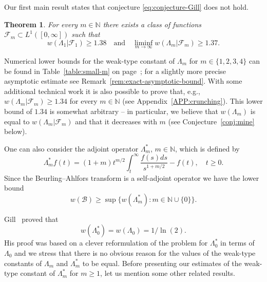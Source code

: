 \documentclass[a4paper]{amsart} %
\newtheorem{theorem}{Theorem}[section]
\theoremstyle{definition}
\theoremstyle{remark}
\numberwithin{equation}{section}
\newcommand*{\LongArxivOrShortJournalVersion}[2]{#1}
\newcommand*{\NN}{\mathbb{N}}
\newcommand*{\NNzero}{\mathbb{N}\cup\{0\}}
\newcommand*{\NNone}{\mathbb{N}}
\newcommand*{\BA}{\mathcal{B}}
\newcommand*{\weakconst}[1]{w(#1)} %
\newcommand*{\weakconstrestricted}[2]{w(#1|#2)} %
\newcommand*{\fclassspec}[1]{\mathcal{F}_{#1}}
\begin{document}
Our first main result states that conjecture \eqref{eq:conjecture-Gill} does not hold.

\begin{theorem}
\label{thm:main-lower-bounds}
For every $m\in\NN$ 
there exists a class of functions $\fclassspec{m}\subset L^1([0,\infty])$ 
such that
\begin{equation*}
\weakconstrestricted{\Lambda_1}{\fclassspec{1}}\geq 1.38
\quad \text{and} \quad
\liminf_{m\to \infty} \weakconstrestricted{\Lambda_m}{\fclassspec{m}} \geq 1.37.
\end{equation*}
\end{theorem}

Numerical lower bounds for the weak-type constant of $\Lambda_m$ for $m\in\{1,2,3,4\}$
can be found in Table~\ref{table:small-m} on page~\pageref{table:small-m};
for a slightly more precise asymptotic estimate see Remark~\ref{rem:exact-asymptotic-bound}.
With some additional technical work it is also possible to prove that, e.g.,  $\weakconstrestricted{\Lambda_m}{\fclassspec{m}} \geq 1.34$ for every $m\in\NN$ (see \LongArxivOrShortJournalVersion{Appendix~\ref{APP:crunching}}{Appendix~B in the arXiv version of this paper}).
This lower bound of $1.34$  
is somewhat arbitrary --  
in particular, we believe that $\weakconst{\Lambda_m}$
is equal to $\weakconstrestricted{\Lambda_m}{\fclassspec{m}}$
and that it decreases with $m$
(see Conjecture~\ref{conj:mine} below).




One can also consider the adjoint operator $\Lambda_m^*$, $m\in\NNone$,
which
is defined by
\begin{equation}
\label{eq:def-Lambda_m^star}
\Lambda_m^* f(t) = (1+m) t^{m/2}  \int_t^\infty\frac{ f(s) ds}{s^{1+m/2}} -  f(t) , \quad t\geq 0.
\end{equation}
Since the Beurling--Ahlfors transform is a self-adjoint operator we have the lower bound
\begin{equation*}
\weakconst{\BA} \geq \sup \{\weakconst{\Lambda_m^*} : m\in\NNzero\}.
\end{equation*}

Gill~\cite{MR2677626} proved that
\[
\weakconst{\Lambda_0^*} = \weakconst{\Lambda_0} = 1/\ln(2).
\]
His proof 
was based on a clever reformulation of the problem for $\Lambda_0^*$ 
in terms of $\Lambda_0$ 
and we stress that there is no obvious reason for the values of the weak-type constants 
of $\Lambda_m$ and $\Lambda_m^*$ to be equal.
Before presenting 
our estimates of the weak-type constant 
of $\Lambda_m^*$ for $m\geq 1$, 
let us mention some other related results.
\end{document}
